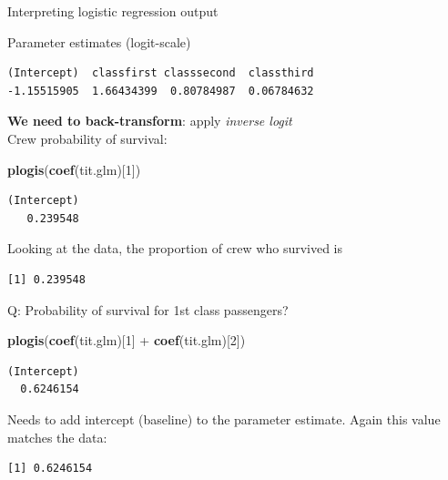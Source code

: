 \documentclass[10pt,ignorenonframetext,]{beamer}
\newenvironment{Shaded}{\begin{snugshade}}{\end{snugshade}}
\newcommand{\KeywordTok}[1]{\textcolor[rgb]{0.13,0.29,0.53}{\textbf{{#1}}}}
\newcommand{\DecValTok}[1]{\textcolor[rgb]{0.00,0.00,0.81}{{#1}}}
\newcommand{\StringTok}[1]{\textcolor[rgb]{0.31,0.60,0.02}{{#1}}}
\newcommand{\NormalTok}[1]{{#1}}
\begin{document}
\begin{frame}[fragile]{Interpreting logistic regression output}

Parameter estimates (logit-scale)

\begin{verbatim}
(Intercept)  classfirst classsecond  classthird 
-1.15515905  1.66434399  0.80784987  0.06784632 
\end{verbatim}

\textbf{We need to back-transform}: apply \emph{inverse logit}\\
Crew probability of survival:

\begin{Shaded}
\begin{Highlighting}[]
\KeywordTok{plogis}\NormalTok{(}\KeywordTok{coef}\NormalTok{(tit.glm)[}\DecValTok{1}\NormalTok{])}
\end{Highlighting}
\end{Shaded}

\begin{verbatim}
(Intercept) 
   0.239548 
\end{verbatim}

Looking at the data, the proportion of crew who survived is

\begin{verbatim}
[1] 0.239548
\end{verbatim}

\end{frame}

\begin{frame}[fragile]{Q: Probability of survival for 1st class
passengers?}

\begin{Shaded}
\begin{Highlighting}[]
\KeywordTok{plogis}\NormalTok{(}\KeywordTok{coef}\NormalTok{(tit.glm)[}\DecValTok{1}\NormalTok{] +}\StringTok{ }\KeywordTok{coef}\NormalTok{(tit.glm)[}\DecValTok{2}\NormalTok{])}
\end{Highlighting}
\end{Shaded}

\begin{verbatim}
(Intercept) 
  0.6246154 
\end{verbatim}

Needs to add intercept (baseline) to the parameter estimate. Again this
value matches the data:

\begin{Shaded}
\end{Shaded}

\begin{verbatim}
[1] 0.6246154
\end{verbatim}

\end{frame}
\end{document}
